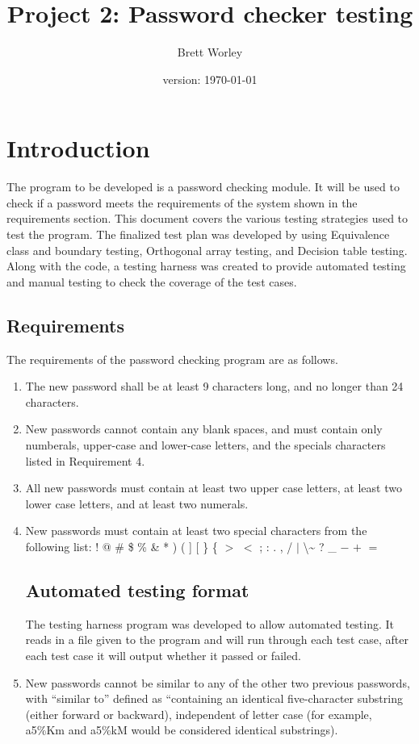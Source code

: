 \documentclass[12pt,letterpaper]{article}
\author{Brett Worley}
\title{Project 2: Password checker testing}
\date{version: \today}
\begin{document}
\maketitle
\tableofcontents



\section{Introduction}

The program to be developed is a password checking module. It will be used to check if a password
meets the requirements of the system shown in the requirements section. This document covers the 
various testing strategies used to test the program. The finalized test plan was developed by using
Equivalence class and boundary testing, Orthogonal array testing, and Decision table testing. Along
with the code, a testing harness was created to provide automated testing and manual testing to check
the coverage of the test cases.

\subsection{Requirements}

The requirements of the password checking program are as follows.

\begin{enumerate}

\item The new password shall be at least 9 characters long, and no longer than
24 characters.
\item New passwords cannot contain any blank spaces, and must contain only numberals, upper-case and lower-case letters, and
the specials characters listed in Requirement 4.
\item All new passwords must contain at least two upper case letters, at least two lower case
letters, and at least two numerals.
\item New passwords must contain at least two special characters from the following list: 
  !  @  \#  \$  \%  \&  *  )  (  ]  [  \}  \{  $>$  $<$  ; 
   :  .  ,  /  $|$   \textbackslash  \~{}  ?  \_  $-$  $+$  $=$ 

\subsection{Automated testing format}

The testing harness program was developed to allow automated testing. It reads in a file given to the
program and will run through each test case, after each test case it will output whether it
passed or failed.

\item New passwords cannot be similar to any of the other two previous passwords, with ``similar to'' defined
as ``containing an identical five-character substring (either forward or backward), independent of letter
case (for example, a5\%Km and a5\%kM would be considered identical substrings).

\end{enumerate}
\end{document}
